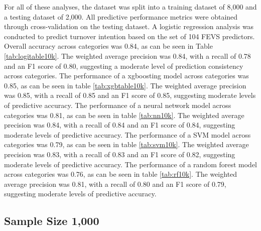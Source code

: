 \documentclass[
  man]{apa7}
\begin{document}
For all of these analyses, the dataset was split into a training dataset of 8,000 and a testing dataset of 2,000. All predictive performance metrics were obtained through cross-validation on the testing dataset. A logistic regression analysis was conducted to predict turnover intention based on the set of 104 FEVS predictors. Overall accuracy across categories was 0.84, as can be seen in Table \ref{tab:logitable10k}. The weighted average precision was 0.84, with a recall of 0.78 and an F1 score of 0.80, suggesting a moderate level of prediction consistency across categories.
The performance of a xgboosting model across categories was 0.85, as can be seen in table \ref{tab:xgbtable10k}. The weighted average precision was 0.85, with a recall of 0.85 and an F1 score of 0.85, suggesting moderate levels of predictive accuracy.
The performance of a neural network model across categories was 0.81, as can be seen in table \ref{tab:nn10k}. The weighted average precision was 0.84, with a recall of 0.84 and an F1 score of 0.84, suggesting moderate levels of predictive accuracy.
The performance of a SVM model across categories was 0.79, as can be seen in table \ref{tab:svm10k}. The weighted average precision was 0.83, with a recall of 0.83 and an F1 score of 0.82, suggesting moderate levels of predictive accuracy.
The performance of a random forest model across categories was 0.76, as can be seen in table \ref{tab:rf10k}. The weighted average precision was 0.81, with a recall of 0.80 and an F1 score of 0.79, suggesting moderate levels of predictive accuracy.

\hypertarget{sample-size-1000}{%
\subsection{Sample Size 1,000}\label{sample-size-1000}}
\end{document}
